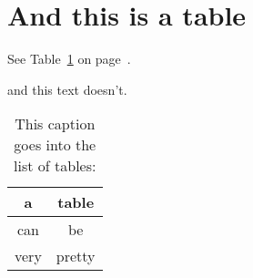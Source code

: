 \section{And this is a table}

See Table~\ref{tab:table_reference} on page~\pageref{tab:table_reference}.

\begin{table}[htb]
\figsp
\caption{This caption goes into the list of tables:}
and this text doesn't. 

\begin{center}
\begin{tabular}{|c||c|}
\hline
a & table \\
\hline
can & be \\
\hline
very & pretty \\
\hline
\end{tabular}
\end{center}

\label{tab:table_reference}

\end{table}
